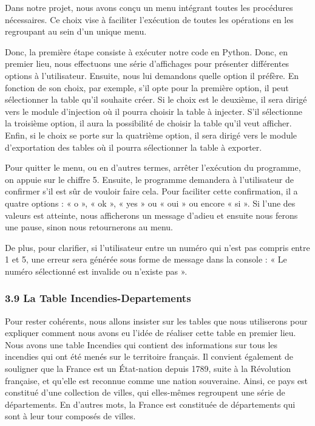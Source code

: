 \documentclass[
]{article}
\begin{document}
Dans notre projet, nous avons conçu un menu intégrant toutes les
procédures nécessaires. Ce choix vise à faciliter l'exécution de toutes
les opérations en les regroupant au sein d'un unique menu.

Donc, la première étape consiste à exécuter notre code en Python. Donc,
en premier lieu, nous effectuons une série d'affichages pour présenter
différentes options à l'utilisateur. Ensuite, nous lui demandons quelle
option il préfère. En fonction de son choix, par exemple, s'il opte pour
la première option, il peut sélectionner la table qu'il souhaite créer.
Si le choix est le deuxième, il sera dirigé vers le module d'injection
où il pourra choisir la table à injecter. S'il sélectionne la troisième
option, il aura la possibilité de choisir la table qu'il veut afficher.
Enfin, si le choix se porte sur la quatrième option, il sera dirigé vers
le module d'exportation des tables où il pourra sélectionner la table à
exporter.

Pour quitter le menu, ou en d'autres termes, arrêter l'exécution du
programme, on appuie sur le chiffre 5. Ensuite, le programme demandera à
l'utilisateur de confirmer s'il est sûr de vouloir faire cela. Pour
faciliter cette confirmation, il a quatre options : « o », « ok », « yes
» ou « oui » ou encore « si ». Si l'une des valeurs est atteinte, nous
afficherons un message d'adieu et ensuite nous ferons une pause, sinon
nous retournerons au menu.

De plus, pour clarifier, si l'utilisateur entre un numéro qui n'est pas
compris entre 1 et 5, une erreur sera générée sous forme de message dans
la console : « Le numéro sélectionné est invalide ou n'existe pas ».

\subsubsection{3.9 La Table
Incendies-Departements}\label{la-table-incendies-departements}

Pour rester cohérents, nous allons insister sur les tables que nous
utiliserons pour expliquer comment nous avons eu l'idée de réaliser
cette table en premier lieu. Nous avons une table Incendies qui contient
des informations sur tous les incendies qui ont été menés sur le
territoire français. Il convient également de souligner que la France
est un État-nation depuis 1789, suite à la Révolution française, et
qu'elle est reconnue comme une nation souveraine. Ainsi, ce pays est
constitué d'une collection de villes, qui elles-mêmes regroupent une
série de départements. En d'autres mots, la France est constituée de
départements qui sont à leur tour composés de villes.
\end{document}
